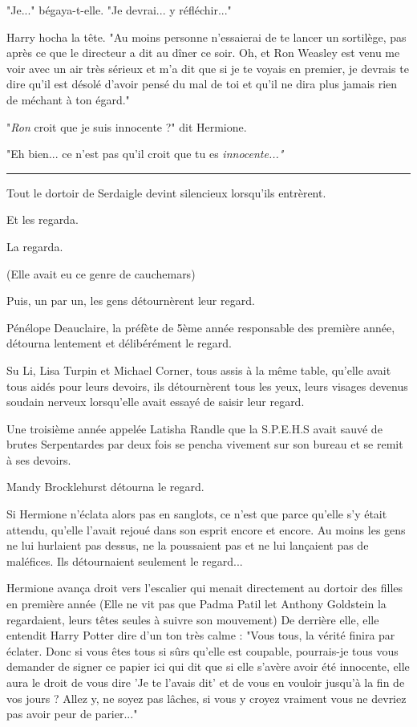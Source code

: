 "Je..." bégaya-t-elle. "Je devrai... y réfléchir..."

Harry hocha la tête. "Au moins personne n'essaierai de te lancer un sortilège, pas après ce que le directeur a dit au dîner ce soir. Oh, et Ron Weasley est venu me voir avec un air très sérieux et m'a dit que si je te voyais en premier, je devrais te dire qu'il est désolé d'avoir pensé du mal de toi et qu'il ne dira plus jamais rien de méchant à ton égard."

"\emph{Ron}  croit que je suis innocente ?" dit Hermione.

"Eh bien... ce n'est pas qu'il croit que tu es \emph{innocente..."} 
\par\noindent\rule{\textwidth}{0.4pt}
Tout le dortoir de Serdaigle devint silencieux lorsqu'ils entrèrent.

Et les regarda.

La regarda.

(Elle avait eu ce genre de cauchemars)

Puis, un par un, les gens détournèrent leur regard.

Pénélope Deauclaire, la préfète de 5ème année responsable des première année, détourna lentement et délibérément le regard.

Su Li, Lisa Turpin et Michael Corner, tous assis à la même table, qu'elle avait tous aidés pour leurs devoirs, ils détournèrent tous les yeux, leurs visages devenus soudain nerveux lorsqu'elle avait essayé de saisir leur regard.

Une troisième année appelée Latisha Randle que la S.P.E.H.S avait sauvé de brutes Serpentardes par deux fois se pencha vivement sur son bureau et se remit à ses devoirs.

Mandy Brocklehurst détourna le regard.

Si Hermione n'éclata alors pas en sanglots, ce n'est que parce qu'elle s'y était attendu, qu'elle l'avait rejoué dans son esprit encore et encore. Au moins les gens ne lui hurlaient pas dessus, ne la poussaient pas et ne lui lançaient pas de maléfices. Ils détournaient seulement le regard...

Hermione avança droit vers l'escalier qui menait directement au dortoir des filles en première année (Elle ne vit pas que Padma Patil let Anthony Goldstein la regardaient, leurs têtes seules à suivre son mouvement) De derrière elle, elle entendit Harry Potter dire d'un ton très calme : "Vous tous, la vérité finira par éclater. Donc si vous êtes tous si sûrs qu'elle est coupable, pourrais-je tous vous demander de signer ce papier ici qui dit que si elle s'avère avoir été innocente, elle aura le droit de vous dire 'Je te l'avais dit' et de vous en vouloir jusqu'à la fin de vos jours ? Allez y, ne soyez pas lâches, si vous y croyez vraiment vous ne devriez pas avoir peur de parier..."

